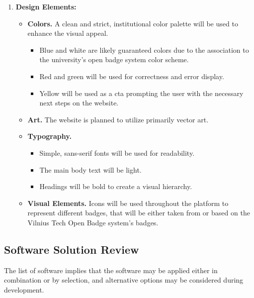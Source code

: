 \begin{enumerate}
\begin{itemize}
    \end{itemize}
    \item \textbf{Design Elements:}
    \begin{itemize}
        \item \textbf{Colors.} A clean and strict, institutional color palette will be used to enhance the visual appeal.
            \begin{itemize}
            \item Blue and white are likely guaranteed colors due to the association to the university's open badge system color scheme. 
            \item Red and green will be used for correctness and error display.
            \item Yellow will be used as a \acrshort{cta} prompting the user with the necessary next steps on the website.
            \end{itemize}
        \item \textbf{Art.} The website is planned to utilize primarily vector art.
        \item \textbf{Typography.} 
            \begin{itemize}
            \item Simple, sans-serif fonts will be used for readability. 
            \item The main body text will be light. 
            \item Headings will be bold to create a visual hierarchy.
            \end{itemize}
        \item \textbf{Visual Elements.} Icons will be used throughout the platform to represent different badges, that will be either taken from or based on the Vilnius Tech Open Badge system's badges.
    \end{itemize}
\end{enumerate}
%

\subsection{Software Solution Review}
%
The list of software implies that the software may be applied either in combination or by selection, and alternative options may be considered during development.\\
%

